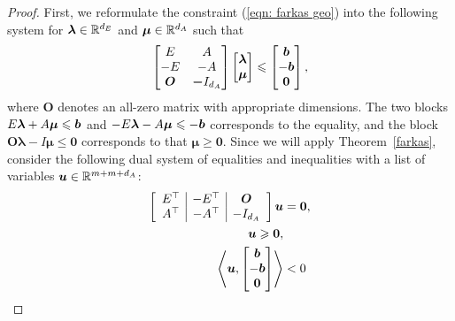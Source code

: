 \begin{proof}
First, we reformulate the constraint (\ref{eqn: farkas geo}) into the following system for $\boldsymbol\lambda \in\mathbb R^{d_E}$ and $\boldsymbol\mu \in\mathbb R^{d_A}$ such that 
\begin{equation}\label{eqn: farkas geo aux}
\begin{bmatrix}
E & A \\
-E & - A \\
\boldsymbol O& \boldsymbol -I_{d_A}
\end{bmatrix}
\begin{bmatrix}
\boldsymbol\lambda \\ \boldsymbol\mu
\end{bmatrix}
\leqslant 
\begin{bmatrix}
{\boldsymbol b}\\ - {\boldsymbol b}\\ \boldsymbol 0
\end{bmatrix}, 
\end{equation}
where $\bm O$ denotes an all-zero matrix with appropriate dimensions. The two blocks $E\boldsymbol\lambda + A\boldsymbol\mu \leqslant {\boldsymbol b}$  and $- E\boldsymbol\lambda - A\boldsymbol\mu \leqslant - {\boldsymbol b}$ corresponds to the equality, and the block $\bm O\bm\lambda - I \bm\mu \leq \bm0$ corresponds to that $\bm\mu\geq\bm0$. Since we will apply Theorem~\ref{farkas}, consider the following dual system of equalities and inequalities with a list of variables ${{\boldsymbol u}}\in\mathbb R^{m + m + d_A}$: 
\begin{equation}\begin{split}\label{eqn: geo farkas dual}
\left[ \begin{array}{c|c|c}
E^\top  & -E^\top & \boldsymbol O\\
A^\top  & -A^\top  & -I_{d_A}
\end{array} \right]
{{\boldsymbol u}} & =  \boldsymbol0, \\
{{\boldsymbol u}} \geqslant \boldsymbol0,  \\
\left\langle{{\boldsymbol u}}, 
\begin{bmatrix} 
{\boldsymbol b}\\  -{\boldsymbol b}\\  \boldsymbol0 
\end{bmatrix}
\right\rangle & < 0\\
\end{split}\end{equation}


\end{proof}

